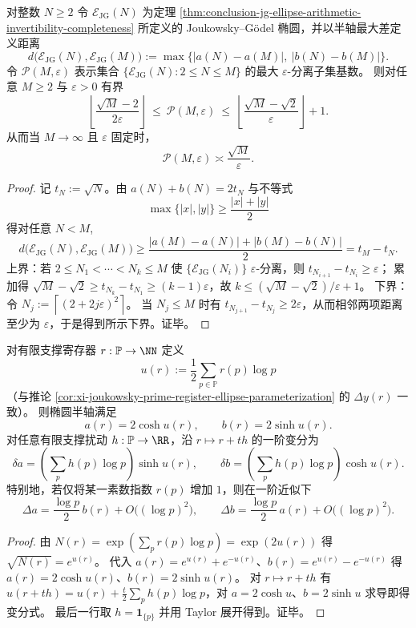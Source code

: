\begin{theorem}\label{thm:conclusion-jg-ellipse-packing-sqrt-law}
对整数 \(N\ge 2\) 令 \(\mathcal{E}_{\mathrm{JG}}(N)\) 为定理 \ref{thm:conclusion-jg-ellipse-arithmetic-invertibility-completeness} 所定义的 Joukowsky--Gödel 椭圆，并以半轴最大差定义距离
\[
d\bigl(\mathcal{E}_{\mathrm{JG}}(N),\mathcal{E}_{\mathrm{JG}}(M)\bigr)
:=
\max\bigl\{|a(N)-a(M)|,\ |b(N)-b(M)|\bigr\}.
\]
令 \(\mathcal P(M,\varepsilon)\) 表示集合 \(\{\mathcal{E}_{\mathrm{JG}}(N):2\le N\le M\}\) 的最大 \(\varepsilon\)-分离子集基数。
则对任意 \(M\ge 2\) 与 \(\varepsilon>0\) 有界
\[
\left\lfloor \frac{\sqrt M-2}{2\varepsilon}\right\rfloor
\ \le\
\mathcal P(M,\varepsilon)
\ \le\
\left\lfloor \frac{\sqrt M-\sqrt 2}{\varepsilon}\right\rfloor+1.
\]
从而当 \(M\to\infty\) 且 \(\varepsilon\) 固定时，
\[
\mathcal P(M,\varepsilon)\asymp \frac{\sqrt M}{\varepsilon}.
\]
\end{theorem}
\begin{proof}
记 \(t_N:=\sqrt N\)。由 \(a(N)+b(N)=2t_N\) 与不等式
\[
\max\{|x|,|y|\}\ge \frac{|x|+|y|}{2}
\]
得对任意 \(N<M\),
\[
d\bigl(\mathcal{E}_{\mathrm{JG}}(N),\mathcal{E}_{\mathrm{JG}}(M)\bigr)
\ge
\frac{|a(M)-a(N)|+|b(M)-b(N)|}{2}
=
t_M-t_N.
\]
上界：若 \(2\le N_1<\cdots<N_k\le M\) 使 \(\{\mathcal{E}_{\mathrm{JG}}(N_i)\}\) \(\varepsilon\)-分离，则 \(t_{N_{i+1}}-t_{N_i}\ge\varepsilon\)；
累加得 \(\sqrt M-\sqrt2\ge t_{N_k}-t_{N_1}\ge(k-1)\varepsilon\)，故 \(k\le (\sqrt M-\sqrt2)/\varepsilon+1\)。
下界：令 \(N_j:=\left\lceil(2+2j\varepsilon)^2\right\rceil\)。
当 \(N_j\le M\) 时有 \(t_{N_{j+1}}-t_{N_j}\ge 2\varepsilon\)，从而相邻两项距离至少为 \(\varepsilon\)，于是得到所示下界。证毕。
\end{proof}

\begin{theorem}\label{thm:conclusion-jg-ellipse-prime-log-generator}
对有限支撑寄存器 \(r:\mathbb P\to\NN\) 定义
\[
u(r):=\frac12\sum_{p\in\mathbb P}r(p)\log p
\]
（与推论 \ref{cor:xi-joukowsky-prime-register-ellipse-parameterization} 的 \(\Delta y(r)\) 一致）。
则椭圆半轴满足
\[
a(r)=2\cosh u(r),
\qquad
b(r)=2\sinh u(r).
\]
对任意有限支撑扰动 \(h:\mathbb P\to\RR\)，沿 \(r\mapsto r+th\) 的一阶变分为
\[
\delta a
=\left(\sum_{p}h(p)\log p\right)\sinh u(r),
\qquad
\delta b
=\left(\sum_{p}h(p)\log p\right)\cosh u(r).
\]
特别地，若仅将某一素数指数 \(r(p)\) 增加 \(1\)，则在一阶近似下
\[
\Delta a=\frac{\log p}{2}\,b(r)+O\!\bigl((\log p)^2\bigr),
\qquad
\Delta b=\frac{\log p}{2}\,a(r)+O\!\bigl((\log p)^2\bigr).
\]
\end{theorem}
\begin{proof}
由 \(N(r)=\exp(\sum_p r(p)\log p)=\exp(2u(r))\) 得 \(\sqrt{N(r)}=e^{u(r)}\)。
代入 \(a(r)=e^{u(r)}+e^{-u(r)}\)、\(b(r)=e^{u(r)}-e^{-u(r)}\) 得 \(a(r)=2\cosh u(r)\)、\(b(r)=2\sinh u(r)\)。
对 \(r\mapsto r+th\) 有 \(u(r+th)=u(r)+\tfrac{t}{2}\sum_p h(p)\log p\)，对 \(a=2\cosh u\)、\(b=2\sinh u\) 求导即得变分式。
最后一行取 \(h=\mathbf 1_{\{p\}}\) 并用 Taylor 展开得到。证毕。
\end{proof}

